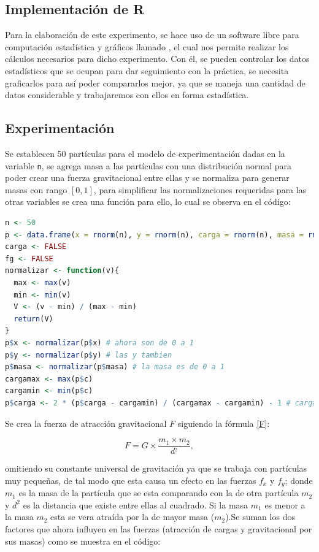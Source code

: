 \documentclass{article}
\begin{document}
\newpage

\subsection{Implementaci\'on de R}
Para la elaboraci\'on de este experimento, se hace uso de un software libre para computaci\'on estad\'istica y gr\'aficos llamado \citet{R}, el cual nos permite realizar los c\'alculos necesarios para dicho experimento. Con \'el, se pueden controlar los datos estad\'isticos que se ocupan para dar seguimiento con la pr\'actica, se necesita graficarlos para as\'i poder compararlos mejor, ya que se maneja una cantidad de datos considerable y trabajaremos con ellos en forma estad\'istica.

\subsection{Experimentaci\'on}

Se establecen 50 part\'iculas para el modelo de experimentaci\'on dadas en la variable \texttt{n}, se agrega masa a las part\'iculas con una distribuci\'on normal para poder crear una fuerza gravitacional entre ellas y se normaliza para generar masas con rango $[0,1]$, para simplificar las normalizaciones requeridas para las otras variables se crea una funci\'on para ello, lo cual se observa en el c\'odigo:

\begin{lstlisting}[language=R]
n <- 50
p <- data.frame(x = rnorm(n), y = rnorm(n), carga = rnorm(n), masa = rnorm(n))
carga <- FALSE
fg <- FALSE
normalizar <- function(v){
  max <- max(v)
  min <- min(v)
  V <- (v - min) / (max - min)
  return(V)
}
p$x <- normalizar(p$x) # ahora son de 0 a 1
p$y <- normalizar(p$y) # las y tambien
p$masa <- normalizar(p$masa) # la masa es de 0 a 1
cargamax <- max(p$c)
cargamin <- min(p$c)
p$carga <- 2 * (p$carga - cargamin) / (cargamax - cargamin) - 1 # cargas son entre -1 y 1
\end{lstlisting}

Se crea la fuerza de atracci\'on gravitacional $F$ siguiendo la f\'ormula \eqref{F}:

\begin{equation}
F = G \times \frac{m_{1} \times m_{2}}{d^{_{2}}},
\label{F}
\end{equation}

omitiendo su constante universal de gravitaci\'on ya que se trabaja con part\'iculas muy peque\~nas, de tal modo que esta causa un efecto en las fuerzas $f_x$ y $f_y$; donde $m_1$ es la masa de la part\'icula que se esta comparando con la de otra part\'icula $m_2$ y $d^2$ es la distancia que existe entre ellas al cuadrado. Si la masa $m_1$ es menor a la masa $m_2$ esta se vera atra\'ida por la de mayor masa ($m_2$).Se suman los dos factores que ahora influyen en las fuerzas (atracci\'on de cargas y gravitacional por sus masas) como se muestra en el c\'odigo:
\end{document}
